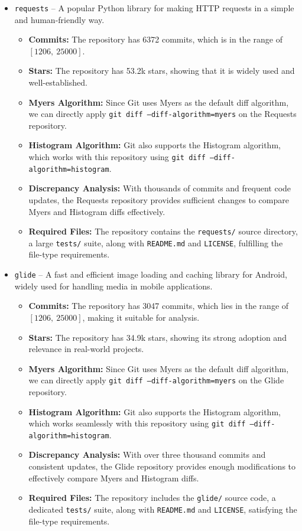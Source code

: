 \documentclass[12pt,a4paper]{article}
\begin{document}
\begin{itemize}
    \item \texttt{requests} -- A popular Python library for making HTTP requests in a simple and human-friendly way.
        \begin{itemize}
            \item \textbf{Commits:} The repository has 6372 commits, which is in the range of $[1206,\ 25000]$.
            \item \textbf{Stars:} The repository has 53.2k stars, showing that it is widely used and well-established.
            \item \textbf{Myers Algorithm:} Since Git uses Myers as the default diff algorithm, we can directly apply \texttt{git diff --diff-algorithm=myers} on the Requests repository.
            \item \textbf{Histogram Algorithm:} Git also supports the Histogram algorithm, which works with this repository using \texttt{git diff --diff-algorithm=histogram}.
            \item \textbf{Discrepancy Analysis:} With thousands of commits and frequent code updates, the Requests repository provides sufficient changes to compare Myers and Histogram diffs effectively.
            \item \textbf{Required Files:} The repository contains the \texttt{requests/} source directory, a large \texttt{tests/} suite, along with \texttt{README.md} and \texttt{LICENSE}, fulfilling the file-type requirements.
        \end{itemize}
    \item \texttt{glide} -- A fast and efficient image loading and caching library for Android, widely used for handling media in mobile applications.  
        \begin{itemize}
            \item \textbf{Commits:} The repository has 3047 commits, which lies in the range of $[1206,\ 25000]$, making it suitable for analysis.  
            \item \textbf{Stars:} The repository has 34.9k stars, showing its strong adoption and relevance in real-world projects.  
            \item \textbf{Myers Algorithm:} Since Git uses Myers as the default diff algorithm, we can directly apply \texttt{git diff --diff-algorithm=myers} on the Glide repository.  
            \item \textbf{Histogram Algorithm:} Git also supports the Histogram algorithm, which works seamlessly with this repository using \texttt{git diff --diff-algorithm=histogram}.  
            \item \textbf{Discrepancy Analysis:} With over three thousand commits and consistent updates, the Glide repository provides enough modifications to effectively compare Myers and Histogram diffs.  
            \item \textbf{Required Files:} The repository includes the \texttt{glide/} source code, a dedicated \texttt{tests/} suite, along with \texttt{README.md} and \texttt{LICENSE}, satisfying the file-type requirements.  
        \end{itemize}
\end{itemize}
\newpage
\end{document}
